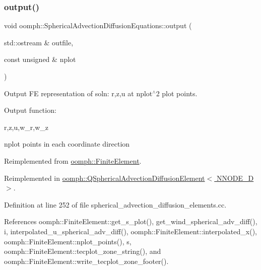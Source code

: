 \subsubsection{\texorpdfstring{output()}{output()}\hspace{0.1cm}{\footnotesize\ttfamily [2/4]}}
{\footnotesize\ttfamily void oomph\+::\+Spherical\+Advection\+Diffusion\+Equations\+::output (\begin{DoxyParamCaption}\item[{std\+::ostream \&}]{outfile,  }\item[{const unsigned \&}]{nplot }\end{DoxyParamCaption})\hspace{0.3cm}{\ttfamily [virtual]}}



Output FE representation of soln\+: r,z,u at nplot$^\wedge$2 plot points. 

Output function\+:

r,z,u,w\+\_\+r,w\+\_\+z

nplot points in each coordinate direction 

Reimplemented from \hyperlink{classoomph_1_1FiniteElement_afa9d9b2670f999b43e6679c9dd28c457}{oomph\+::\+Finite\+Element}.



Reimplemented in \hyperlink{classoomph_1_1QSphericalAdvectionDiffusionElement_abc3c98e85e168e66999ccae5a35e0987}{oomph\+::\+Q\+Spherical\+Advection\+Diffusion\+Element$<$ N\+N\+O\+D\+E\+\_\+D $>$}.



Definition at line 252 of file spherical\+\_\+advection\+\_\+diffusion\+\_\+elements.\+cc.



References oomph\+::\+Finite\+Element\+::get\+\_\+s\+\_\+plot(), get\+\_\+wind\+\_\+spherical\+\_\+adv\+\_\+diff(), i, interpolated\+\_\+u\+\_\+spherical\+\_\+adv\+\_\+diff(), oomph\+::\+Finite\+Element\+::interpolated\+\_\+x(), oomph\+::\+Finite\+Element\+::nplot\+\_\+points(), s, oomph\+::\+Finite\+Element\+::tecplot\+\_\+zone\+\_\+string(), and oomph\+::\+Finite\+Element\+::write\+\_\+tecplot\+\_\+zone\+\_\+footer().

\mbox{\label{classoomph_1_1SphericalAdvectionDiffusionEquations_a5e2334112c6c967c490fc9e5f54f5b35}} 
